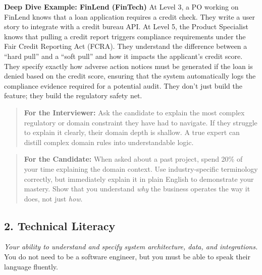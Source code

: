 \textbf{Deep Dive Example: FinLend (FinTech)} At Level 3, a PO working
on FinLend knows that a loan application requires a credit check. They
write a user story to integrate with a credit bureau API. At Level 5,
the Product Specialist knows that pulling a credit report triggers
compliance requirements under the Fair Credit Reporting Act (FCRA). They
understand the difference between a ``hard pull'' and a ``soft pull''
and how it impacts the applicant's credit score. They specify exactly
how adverse action notices must be generated if the loan is denied based
on the credit score, ensuring that the system automatically logs the
compliance evidence required for a potential audit. They don't just
build the feature; they build the regulatory safety net.

\begin{quote}
\textbf{For the Interviewer:} Ask the candidate to explain the most
complex regulatory or domain constraint they have had to navigate. If
they struggle to explain it clearly, their domain depth is shallow. A
true expert can distill complex domain rules into understandable logic.
\end{quote}

\begin{quote}
\textbf{For the Candidate:} When asked about a past project, spend 20\%
of your time explaining the domain context. Use industry-specific
terminology correctly, but immediately explain it in plain English to
demonstrate your mastery. Show that you understand \emph{why} the
business operates the way it does, not just \emph{how}.
\end{quote}

\subsection{2. Technical Literacy}\label{technical-literacy}

\emph{Your ability to understand and specify system architecture, data,
and integrations.} You do not need to be a software engineer, but you
must be able to speak their language fluently.

